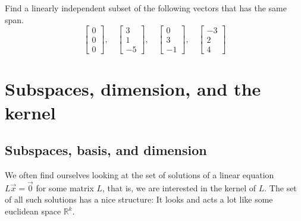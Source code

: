 \begin{exercise}
Find a linearly independent subset of the following vectors that has
the same span.
\begin{equation*}
\begin{bmatrix}
0 \\ 0 \\ 0
\end{bmatrix}
, \quad
\begin{bmatrix}
3 \\ 1 \\ -5
\end{bmatrix}
, \quad
\begin{bmatrix}
0 \\ 3 \\ -1
\end{bmatrix}
, \quad
\begin{bmatrix}
-3 \\ 2 \\ 4
\end{bmatrix}
\end{equation*}
\end{exercise}




\sectionnewpage
\section{Subspaces, dimension, and the kernel}
\label{subspaces:section}



\subsection{Subspaces, basis, and dimension}

We often find ourselves looking at the set of
solutions of a linear equation $L\vec{x} = \vec{0}$ for some matrix $L$,
that is, we are interested in the kernel of $L$.
The set of all such solutions has a nice structure:  It looks and
acts a lot like some euclidean space ${\mathbb R}^k$.

